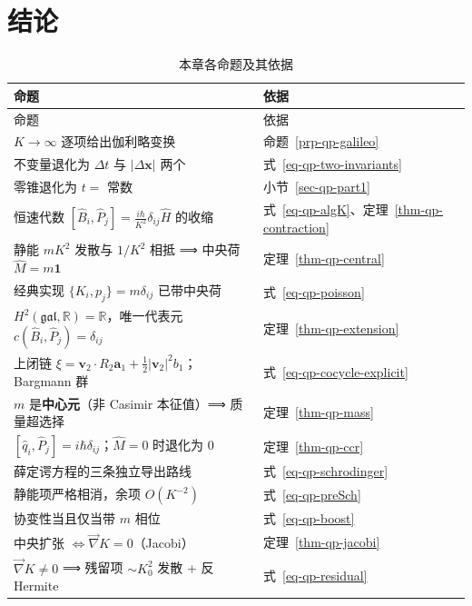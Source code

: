 \documentclass[
  chinese,
  a4paper,
  UTF8,
  12pt,
  oneside,
  openany]{ctexbook}
\theoremstyle{plain}
\theoremstyle{plain}
\theoremstyle{plain}
\theoremstyle{definition}
\theoremstyle{plain}
\theoremstyle{plain}
\theoremstyle{remark}
\begin{document}
\section{结论}\label{sec-qp-conclusion}

\begin{longtable}[]{@{}
  >{\raggedright\arraybackslash}p{}
  >{\raggedright\arraybackslash}p{}@{}}
\caption{本章各命题及其依据}\label{tbl-qp-conclusion}\tabularnewline
\toprule\noalign{}
\begin{minipage}[b]{\linewidth}\raggedright
命题
\end{minipage} & \begin{minipage}[b]{\linewidth}\raggedright
依据
\end{minipage} \\
\midrule\noalign{}
\endfirsthead
\toprule\noalign{}
\begin{minipage}[b]{\linewidth}\raggedright
命题
\end{minipage} & \begin{minipage}[b]{\linewidth}\raggedright
依据
\end{minipage} \\
\midrule\noalign{}
\endhead
\bottomrule\noalign{}
\endlastfoot
\(K\to\infty\) 逐项给出伽利略变换 & 命题~\ref{prp-qp-galileo} \\
不变量退化为 \(\Delta t\) 与 \(\lvert\Delta\mathbf{x}\rvert\) 两个 &
式~\ref{eq-qp-two-invariants} \\
零锥退化为 \(t=\) 常数 & 小节~\ref{sec-qp-part1} \\
恒速代数 \([\hat B_i,\hat P_j]=\frac{i\hbar}{K^{2}}\delta_{ij}\hat H\)
的收缩 & 式~\ref{eq-qp-algK}、定理~\ref{thm-qp-contraction} \\
静能 \(mK^{2}\) 发散与 \(1/K^{2}\) 相抵 ⟹ 中央荷 \(\hat M=m\mathbf 1\) &
定理~\ref{thm-qp-central} \\
经典实现 \(\{K_i,p_j\}=m\delta_{ij}\) 已带中央荷 &
式~\ref{eq-qp-poisson} \\
\(H^{2}(\mathfrak{gal},\mathbb R)=\mathbb R\)，唯一代表元
\(c(\hat B_i,\hat P_j)=\delta_{ij}\) & 定理~\ref{thm-qp-extension} \\
上闭链
\(\xi=\mathbf v_2\cdot R_2\mathbf a_1+\frac12\lvert\mathbf v_2\rvert^{2}b_1\)；Bargmann
群 & 式~\ref{eq-qp-cocycle-explicit} \\
\(m\) 是\textbf{中心元}（非 Casimir 本征值）⟹ 质量超选择 &
定理~\ref{thm-qp-mass} \\
\([\hat q_i,\hat P_j]=i\hbar\delta_{ij}\)；\(\hat M=0\) 时退化为 \(0\) &
定理~\ref{thm-qp-ccr} \\
薛定谔方程的三条独立导出路线 & 式~\ref{eq-qp-schrodinger} \\
静能项严格相消，余项 \(O(K^{-2})\) & 式~\ref{eq-qp-preSch} \\
协变性当且仅当带 \(m\) 相位 & 式~\ref{eq-qp-boost} \\
中央扩张 \(\Longleftrightarrow\vec\nabla K=0\)（Jacobi） &
定理~\ref{thm-qp-jacobi} \\
\(\vec\nabla K\neq0\) ⟹ 残留项 \(\sim K_0^{2}\) 发散 + 反 Hermite &
式~\ref{eq-qp-residual} \\
\end{longtable}
\end{document}
